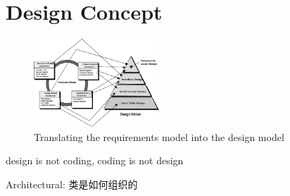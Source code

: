 \newpage
\section{Design Concept}
\begin{figure}[!htb]
    \centering
    \includegraphics[width=0.42\textwidth]{pic/SE5/Translating the requirements model into the design model}
    \caption{Translating the requirements model into the design model}
\end{figure}

design is not coding, coding is not design

Architectural: 类是如何组织的